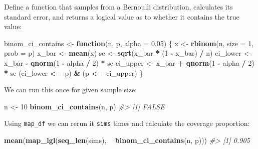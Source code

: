 \documentclass[]{book}
\newenvironment{Shaded}{\begin{snugshade}}{\end{snugshade}}
\newcommand{\CommentTok}[1]{\textcolor[rgb]{0.56,0.35,0.01}{\textit{#1}}}
\newcommand{\ControlFlowTok}[1]{\textcolor[rgb]{0.13,0.29,0.53}{\textbf{#1}}}
\newcommand{\DataTypeTok}[1]{\textcolor[rgb]{0.13,0.29,0.53}{#1}}
\newcommand{\DecValTok}[1]{\textcolor[rgb]{0.00,0.00,0.81}{#1}}
\newcommand{\FloatTok}[1]{\textcolor[rgb]{0.00,0.00,0.81}{#1}}
\newcommand{\KeywordTok}[1]{\textcolor[rgb]{0.13,0.29,0.53}{\textbf{#1}}}
\newcommand{\NormalTok}[1]{#1}
\newcommand{\OperatorTok}[1]{\textcolor[rgb]{0.81,0.36,0.00}{\textbf{#1}}}
\newcommand{\StringTok}[1]{\textcolor[rgb]{0.31,0.60,0.02}{#1}}
\theoremstyle{definition}
\theoremstyle{definition}
\theoremstyle{definition}
\theoremstyle{remark}
\begin{document}
Define a function that samples from a Bernoulli distribution, calculates
its standard error, and returns a logical value as to whether it
contains the true value:

\begin{Shaded}
\begin{Highlighting}[]
\NormalTok{binom_ci_contains <-}\StringTok{ }\ControlFlowTok{function}\NormalTok{(n, p, }\DataTypeTok{alpha =} \FloatTok{0.05}\NormalTok{) \{}
\NormalTok{  x <-}\StringTok{ }\KeywordTok{rbinom}\NormalTok{(n, }\DataTypeTok{size =} \DecValTok{1}\NormalTok{, }\DataTypeTok{prob =}\NormalTok{ p)}
\NormalTok{  x_bar <-}\StringTok{ }\KeywordTok{mean}\NormalTok{(x)}
\NormalTok{  se <-}\StringTok{ }\KeywordTok{sqrt}\NormalTok{(x_bar }\OperatorTok{*}\StringTok{ }\NormalTok{(}\DecValTok{1} \OperatorTok{-}\StringTok{ }\NormalTok{x_bar) }\OperatorTok{/}\StringTok{ }\NormalTok{n)}
\NormalTok{  ci_lower <-}\StringTok{ }\NormalTok{x_bar }\OperatorTok{-}\StringTok{ }\KeywordTok{qnorm}\NormalTok{(}\DecValTok{1} \OperatorTok{-}\StringTok{ }\NormalTok{alpha }\OperatorTok{/}\StringTok{ }\DecValTok{2}\NormalTok{) }\OperatorTok{*}\StringTok{ }\NormalTok{se}
\NormalTok{  ci_upper <-}\StringTok{ }\NormalTok{x_bar }\OperatorTok{+}\StringTok{ }\KeywordTok{qnorm}\NormalTok{(}\DecValTok{1} \OperatorTok{-}\StringTok{ }\NormalTok{alpha }\OperatorTok{/}\StringTok{ }\DecValTok{2}\NormalTok{) }\OperatorTok{*}\StringTok{ }\NormalTok{se}
\NormalTok{  (ci_lower }\OperatorTok{<=}\StringTok{ }\NormalTok{p) }\OperatorTok{&}\StringTok{ }\NormalTok{(p }\OperatorTok{<=}\StringTok{ }\NormalTok{ci_upper)}
\NormalTok{\}}
\end{Highlighting}
\end{Shaded}

We can run this once for given sample size:

\begin{Shaded}
\begin{Highlighting}[]
\NormalTok{n <-}\StringTok{ }\DecValTok{10}
\KeywordTok{binom_ci_contains}\NormalTok{(n, p)}
\CommentTok{#> [1] FALSE}
\end{Highlighting}
\end{Shaded}

Using \texttt{map\_df} we can rerun it \texttt{sims} times and calculate
the coverage proportion:

\begin{Shaded}
\begin{Highlighting}[]
\KeywordTok{mean}\NormalTok{(}\KeywordTok{map_lgl}\NormalTok{(}\KeywordTok{seq_len}\NormalTok{(sims), }\OperatorTok{~}\StringTok{ }\KeywordTok{binom_ci_contains}\NormalTok{(n, p)))}
\CommentTok{#> [1] 0.905}
\end{Highlighting}
\end{Shaded}
\end{document}
